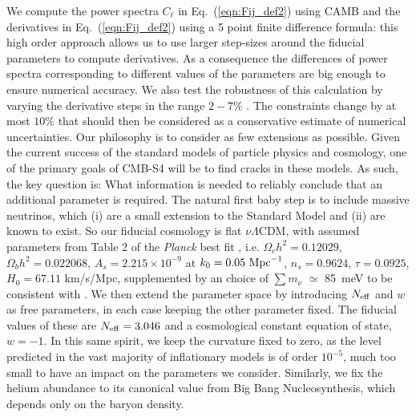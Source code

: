 \documentclass[aps,prd,reprint,superscriptaddress]{revtex4-1}
\newcommand\refeq[1]{Eq.~(\ref{eqn:#1})}
\begin{document}
We compute the power spectra $C_{\ell}$ in \refeq{Fij_def2} using CAMB \cite{Howlett:2012mh,Lewis:1999bs} and
the derivatives in \refeq{Fij_def2} using a 5 point finite difference formula:
this high order approach allows us to use larger step-sizes around the fiducial parameters to compute derivatives. As a consequence the differences of power spectra corresponding to different values of the parameters are big enough to ensure numerical accuracy. We also test the robustness of this calculation by varying the derivative steps in the range $2-7\%$ . The constraints change by at most $10\%$ that should then be considered as a conservative estimate of numerical uncertainties. 
Our philosophy is to consider as few extensions as possible. Given the current success of the standard models of particle physics and cosmology, one of the primary goals of CMB-S4 will be to find cracks in these models. As such, the key question is: What information is needed to reliably conclude that an additional parameter is required. The natural first baby step is to include massive neutrinos, which (i) are a small extension to the Standard Model and (ii) are known to exist. So our fiducial cosmology is flat $\nu \Lambda$CDM, with assumed 
parameters from Table 2 of the \textit{Planck} best fit \cite{planck-collaboration:2014g}, i.e. $\Omega_c h^2 = 0.12029$, $\Omega_b h^2 = 0.022068$, $A_s = 2.215\times10^{-9}$ at $k_0 = 0.05\ {\rm Mpc}^{-1}$, $n_s = 0.9624$, $\tau = 0.0925$, $H_0 = 67.11$ km/s/Mpc, supplemented by an choice of $\sum m_\nu$ $\simeq$ 85\ meV to be consistent with \cite{wu:2014}.  
We then extend the parameter space by introducing $N_{\rm eff}$ and $w$ as free parameters, in each case keeping the other parameter fixed.
The fiducial values of these are $N_{\rm eff}=3.046$ and a cosmological constant equation of state, $w=-1$. In this same spirit, we keep the curvature fixed to zero, as the level predicted in the vast majority of inflationary models is of order $10^{-5}$, much too small to have an impact on the parameters we consider. Similarly, we fix the helium abundance to its canonical value from Big Bang Nucleosynthesis, which depends only on the baryon density.
\end{document}
